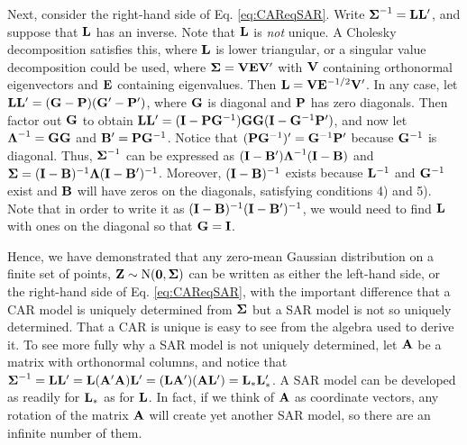 \documentclass[11pt, titlepage]{article}\usepackage[]{graphicx}\usepackage[]{color}
\begin{document}
\begin{spacing}{1.9}
\begin{flushleft}
Next, consider the right-hand side of Eq. \ref{eq:CAReqSAR}. Write $\mbox{\boldmath $\Sigma$}^{-1} = \mathbf{L}\mathbf{L}^{\prime}$, and suppose that $\mathbf{L}$ has an inverse. Note that $\mathbf{L}$ is \emph{not} unique.  A Cholesky decomposition satisfies this, where $\mathbf{L}$ is lower triangular, or a singular value decomposition could be used, where $\mbox{\boldmath $\Sigma$} = \mathbf{V}\mathbf{E}\mathbf{V}^{\prime}$ with $\mathbf{V}$ containing orthonormal eigenvectors and $\mathbf{E}$ containing eigenvalues. Then $\mathbf{L} = \mathbf{V}\mathbf{E}^{-1/2}\mathbf{V}^{\prime}$. In any case, let  $\mathbf{L}\mathbf{L}^{\prime} = (\mathbf{G} - \mathbf{P})(\mathbf{G}^{\prime} - \mathbf{P}^{\prime})$, where $\mathbf{G}$ is diagonal and $\mathbf{P}$ has zero diagonals. Then factor out $\mathbf{G}$ to obtain $\mathbf{L}\mathbf{L}^{\prime} = (\mathbf{I} - \mathbf{P}\mathbf{G}^{-1})\mathbf{G}\mathbf{G}(\mathbf{I} - \mathbf{G}^{-1}\mathbf{P}^{\prime})$, and now let $\mbox{\boldmath $\Lambda$}^{-1} = \mathbf{G}\mathbf{G}$ and $\mathbf{B}^{\prime} = \mathbf{P}\mathbf{G}^{-1}$.  Notice that $(\mathbf{P}\mathbf{G}^{-1})^{\prime} = \mathbf{G}^{-1}\mathbf{P}^{\prime}$ because $\mathbf{G}^{-1}$ is diagonal. Thus, $\mbox{\boldmath $\Sigma$}^{-1}$ can be expressed as $(\mathbf{I} - \mathbf{B}^{\prime})\mbox{\boldmath $\Lambda$}^{-1}(\mathbf{I} - \mathbf{B})$ and $\mbox{\boldmath $\Sigma$} = (\mathbf{I} - \mathbf{B})^{-1}\mbox{\boldmath $\Lambda$}(\mathbf{I} - \mathbf{B}^{\prime})^{-1}$. Moreover, $(\mathbf{I} - \mathbf{B})^{-1}$ exists because $\mathbf{L}^{-1}$ and $\mathbf{G}^{-1}$ exist and $\mathbf{B}$ will have zeros on the diagonals, satisfying conditions 4) and 5).  Note that in order to write it as $(\mathbf{I} - \mathbf{B})^{-1}(\mathbf{I} - \mathbf{B}^{\prime})^{-1}$, we would need to find $\mathbf{L}$ with ones on the diagonal so that $\mathbf{G} = \mathbf{I}$.

Hence, we have demonstrated that any zero-mean Gaussian distribution on a finite set of points, $\mathbf{Z} \sim \textrm{N}(\mathbf{0},\mbox{\boldmath $\Sigma$})$ can be written as either the left-hand side, or the right-hand side of Eq. \ref{eq:CAReqSAR}, with the important difference that a CAR model is uniquely determined from $\mbox{\boldmath $\Sigma$}$ but a SAR model is not so uniquely determined.  That a CAR is unique is easy to see from the algebra used to derive it.  To see more fully why a SAR model is not uniquely determined, let $\mathbf{A}$ be a matrix with orthonormal columns, and notice that $\mbox{\boldmath $\Sigma$}^{-1} = \mathbf{L}\mathbf{L}^{\prime} = \mathbf{L}(\mathbf{A}^{\prime}\mathbf{A})\mathbf{L}^{\prime} = (\mathbf{L}\mathbf{A}^{\prime})(\mathbf{A}\mathbf{L}^{\prime}) = \mathbf{L}_*\mathbf{L}_*^{\prime}$.  A SAR model can be developed as readily for $ \mathbf{L}_*$ as for $\mathbf{L}$.  In fact, if we think of $\mathbf{A}$ as coordinate vectors, any rotation of the matrix $\mathbf{A}$ will create yet another SAR model, so there are an infinite number of them.


\end{flushleft}
\end{spacing}
\end{document}
